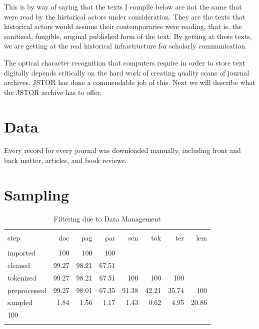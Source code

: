 \documentclass[]{book}
\theoremstyle{definition}
\theoremstyle{definition}
\theoremstyle{definition}
\theoremstyle{remark}
\begin{document}
This is by way of saying that the texts I compile below are not the same
that were read by the historical actors under consideration. They are
the texts that historical actors would assume their contemporaries were
reading, that is, the sanitized, fungible, original published form of
the text. By getting at these texts, we are getting at the real
historical infrastructure for scholarly communication.

The optical character recognition that computers require in order to
store text digitally depends critically on the hard work of creating
quality scans of journal archives. JSTOR has done a commendable job of
this. Next we will describe what the JSTOR archive has to offer.

\hypertarget{kd-dd}{%
\section{Data}\label{kd-dd}}

Every record for every journal was downloaded manually, including front
and back matter, articles, and book reviews.

\hypertarget{kd-dp1}{%
\section{Sampling}\label{kd-dp1}}

\begin{table}[!htbp] \centering 
  \caption{Filtering due to Data Management} 
  \label{tab:filt} 
\begin{tabular}{@{\extracolsep{5pt}} lrrrrrrr} 
\\[-1.8ex]\hline 
\hline \\[-1.8ex] 
step & doc & pag & par & sen & tok & ter & lem \\ 
\hline \\[-1.8ex] 
imported & 100 & 100 & 100 &  &  &  &  \\ 
cleaned & 99.27 & 98.21 & 67.51 &  &  &  &  \\ 
tokenized & 99.27 & 98.21 & 67.51 & 100 & 100 & 100 &  \\ 
preprocessed & 99.27 & 98.01 & 67.35 & 91.38 & 42.21 & 35.74 & 100 \\ 
sampled & 1.84 & 1.56 & 1.17 & 1.43 & 0.62 & 4.95 & 20.86 \\ 
100\\%
\hline \\[-1.8ex] 
\end{tabular} 
\end{table}
\end{document}
